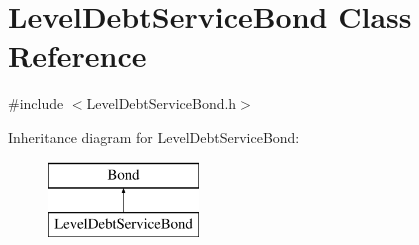 \hypertarget{classLevelDebtServiceBond}{}\section{Level\+Debt\+Service\+Bond Class Reference}
\label{classLevelDebtServiceBond}


{\ttfamily \#include $<$Level\+Debt\+Service\+Bond.\+h$>$}

Inheritance diagram for Level\+Debt\+Service\+Bond\+:\begin{figure}[H]
\begin{center}
\leavevmode
\includegraphics[height=2.000000cm]{classLevelDebtServiceBond}
\end{center}
\end{figure}
